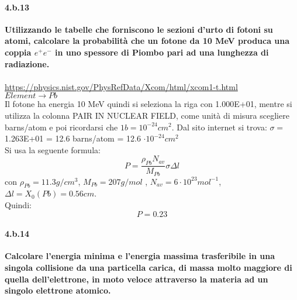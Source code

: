 \documentclass[twoside]{article}
\begin{document}
\paragraph{4.b.13}\textbf{Utilizzando le tabelle che forniscono le sezioni d'urto di fotoni su atomi, calcolare la probabilità che un fotone da 10 MeV produca una coppia $e^+e^-$ in uno spessore di Piombo pari ad una lunghezza di radiazione.}\\
\\
\url{https://physics.nist.gov/PhysRefData/Xcom/html/xcom1-t.html} \\
$Element \rightarrow Pb $\\
Il fotone ha energia 10 MeV quindi si seleziona la riga con 1.000E+01, mentre si utilizza la colonna PAIR IN NUCLEAR FIELD, come unità di misura scegliere barns/atom e poi ricordarsi che $ 1 b= 10^{-24} cm^2$.
Dal sito internet si trova: $\sigma=$ 1.263E+01 = 12.6 barns/atom = 12.6 $\cdot 10^{-24} cm^2$\\
Si usa la seguente formula:
\begin{equation*}
    P= \frac{\rho_{Pb} N_{av}}{M_{Pb}}\sigma \Delta l
\end{equation*}
con $\rho_{Pb}= 11.3 g/cm^3 $, $M_{Pb}= 207 g/mol $ , $N_{av}=6 \cdot 10^{23} mol^{-1}$, $\Delta l=X_0(Pb)= 0.56 cm$.\\
Quindi: 
\[
P= 0.23
\]

\paragraph{4.b.14}\textbf{Calcolare l’energia minima e l'energia massima trasferibile in una singola
collisione da una particella carica, di massa molto maggiore di quella dell'elettrone, in moto veloce attraverso la materia ad un singolo elettrone atomico.}\\
\\
\end{document}
